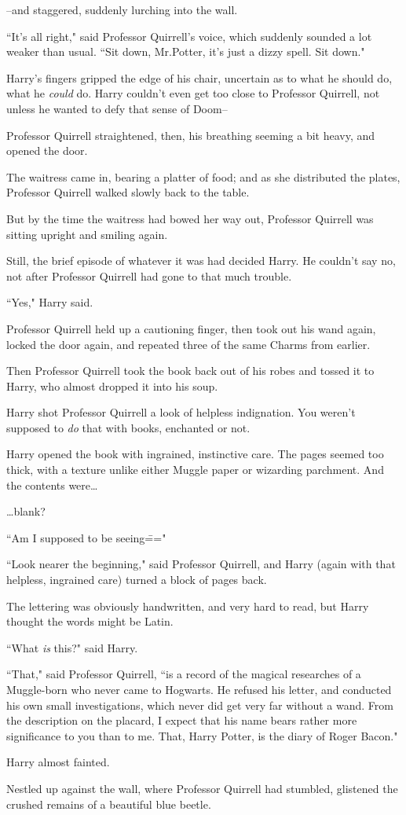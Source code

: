 \---and staggered, suddenly lurching into the wall.

``It's all right," said Professor Quirrell's voice, which suddenly sounded a lot weaker than usual. ``Sit down, Mr.\?Potter, it's just a dizzy spell. Sit down."

Harry's fingers gripped the edge of his chair, uncertain as to what he should do, what he \emph{could} do. Harry couldn't even get too close to Professor Quirrell, not unless he wanted to defy that sense of Doom\---

Professor Quirrell straightened, then, his breathing seeming a bit heavy, and opened the door.

The waitress came in, bearing a platter of food; and as she distributed the plates, Professor Quirrell walked slowly back to the table.

But by the time the waitress had bowed her way out, Professor Quirrell was sitting upright and smiling again.

Still, the brief episode of whatever it was had decided Harry. He couldn't say no, not after Professor Quirrell had gone to that much trouble.

``Yes," Harry said.

Professor Quirrell held up a cautioning finger, then took out his wand again, locked the door again, and repeated three of the same Charms from earlier.

Then Professor Quirrell took the book back out of his robes and tossed it to Harry, who almost dropped it into his soup.

Harry shot Professor Quirrell a look of helpless indignation. You weren't supposed to \emph{do} that with books, enchanted or not.

Harry opened the book with ingrained, instinctive care. The pages seemed too thick, with a texture unlike either Muggle paper or wizarding parchment. And the contents were{\ldots}

{\ldots}blank?

``Am I supposed to be seeing\==="

``Look nearer the beginning," said Professor Quirrell, and Harry (again with that helpless, ingrained care) turned a block of pages back.

The lettering was obviously handwritten, and very hard to read, but Harry thought the words might be Latin.

``What \emph{is} this?" said Harry.

``That," said Professor Quirrell, ``is a record of the magical researches of a Muggle-born who never came to Hogwarts. He refused his letter, and conducted his own small investigations, which never did get very far without a wand. From the description on the placard, I expect that his name bears rather more significance to you than to me. That, Harry Potter, is the diary of Roger Bacon."

Harry almost fainted.

Nestled up against the wall, where Professor Quirrell had stumbled, glistened the crushed remains of a beautiful blue beetle.

